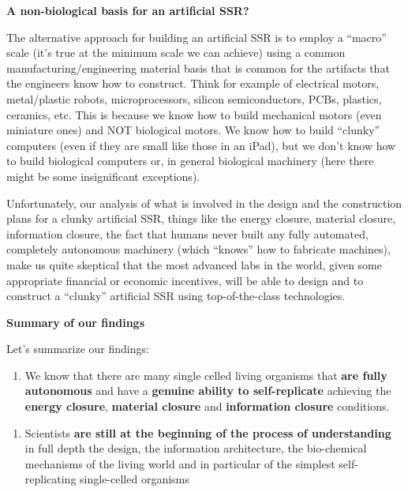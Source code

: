 \documentclass[letterpaper]{article}
\begin{document}
\bigskip

\textbf{A non-biological basis for an artificial SSR?}


\bigskip

The alternative approach for building an artificial SSR is to employ a
“macro” scale (it’s true at the minimum scale we can achieve) using a
common manufacturing/engineering material basis that is common for the
artifacts that the engineers know how to construct. Think for example
of electrical motors, metal/plastic robots, microprocessors, silicon
semiconductors, PCBs, plastics, ceramics, etc. This is because we know
how to build mechanical motors (even miniature ones) and NOT biological
motors. We know how to build “clunky” computers (even if they are small
like those in an iPad), but we don’t know how to build biological
computers or, in general biological machinery (here there might be some
insignificant exceptions).


\bigskip

Unfortunately, our analysis of what is involved in  the design and the
construction plans for a clunky artificial SSR, things like the energy
closure, material closure, information closure, the fact that humans
never built any fully automated, completely autonomous machinery (which
“knows” how to fabricate machines), make us quite skeptical that the
most advanced labs in the world, given some appropriate financial or
economic incentives, will be able to design and to construct a “clunky”
 artificial SSR using top-of-the-class technologies.


\bigskip

\textbf{Summary of our findings}


\bigskip

Let’s summarize our findings:


\bigskip

\begin{enumerate}
\item We know that there are many single celled living organisms that
\textbf{are fully autonomous} and have a \textbf{genuine ability to
self-replicate} achieving the \textbf{energy closure}, \textbf{material
closure} and \textbf{information closure} conditions.
\end{enumerate}

\bigskip

\begin{enumerate}
\item Scientists \textbf{are still at the beginning of the process of
understanding} in full depth the design, the information architecture,
the bio-chemical mechanisms of the living world and in particular of
the simplest self-replicating single-celled organisms
\end{enumerate}
\end{document}
